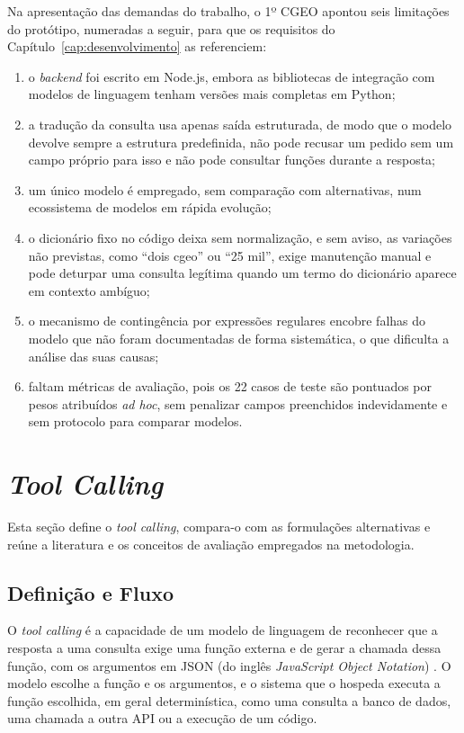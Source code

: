 Na apresentação das demandas do trabalho, o 1º CGEO apontou seis limitações do protótipo, numeradas a seguir, para que os requisitos do Capítulo~\ref{cap:desenvolvimento} as referenciem:
\begin{enumerate}
  \item o \textit{backend} foi escrito em Node.js, embora as bibliotecas de integração com modelos de linguagem tenham versões mais completas em Python;
  \item a tradução da consulta usa apenas saída estruturada, de modo que o modelo devolve sempre a estrutura predefinida, não pode recusar um pedido sem um campo próprio para isso e não pode consultar funções durante a resposta;
  \item um único modelo é empregado, sem comparação com alternativas, num ecossistema de modelos em rápida evolução;
  \item o dicionário fixo no código deixa sem normalização, e sem aviso, as variações não previstas, como ``dois cgeo'' ou ``25 mil'', exige manutenção manual e pode deturpar uma consulta legítima quando um termo do dicionário aparece em contexto ambíguo;
  \item o mecanismo de contingência por expressões regulares encobre falhas do modelo que não foram documentadas de forma sistemática, o que dificulta a análise das suas causas;
  \item faltam métricas de avaliação, pois os 22 casos de teste são pontuados por pesos atribuídos \textit{ad hoc}, sem penalizar campos preenchidos indevidamente e sem protocolo para comparar modelos.
\end{enumerate}

\section{\texorpdfstring{\textit{Tool Calling}}{Tool Calling}}
\label{sec:toolcalling}

Esta seção define o \textit{tool calling}, compara-o com as formulações alternativas e reúne a literatura e os conceitos de avaliação empregados na metodologia.

\subsection{Definição e Fluxo}
\label{sec:tc-definicao}

O \textit{tool calling} é a capacidade de um modelo de linguagem de reconhecer que a resposta a uma consulta exige uma função externa e de gerar a chamada dessa função, com os argumentos em JSON (do inglês \textit{JavaScript Object Notation}) \cite{schick2023toolformer, qin2023toolllm}. O modelo escolhe a função e os argumentos, e o sistema que o hospeda executa a função escolhida, em geral determinística, como uma consulta a banco de dados, uma chamada a outra API ou a execução de um código.


